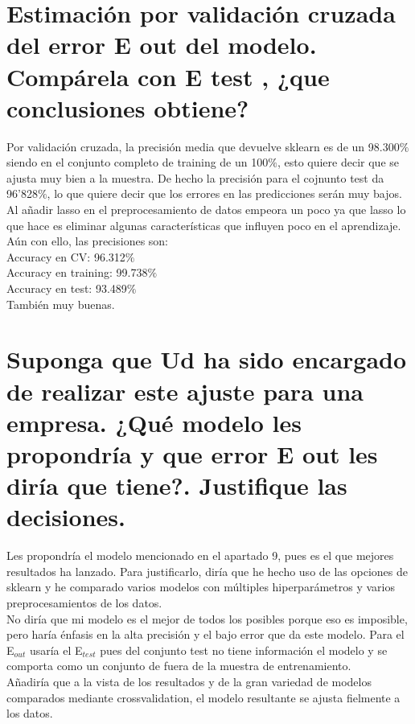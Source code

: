 \documentclass[12pt]{article}
\begin{document}
\section{Estimación por validación cruzada del error E out del modelo. Compárela con E test , ¿que
conclusiones obtiene?}

Por validación cruzada, la precisión media que devuelve sklearn es de un 98.300$\%$ siendo en el conjunto completo de training de un 100$\%$, esto quiere decir que se ajusta muy bien a la muestra. De hecho la precisión para el cojnunto test da 96'828$\%$, lo que quiere decir que los errores en las predicciones serán muy bajos.\\
Al añadir lasso en el preprocesamiento de datos empeora un poco ya que lasso lo que hace es eliminar algunas características que influyen poco en el aprendizaje. Aún con ello, las precisiones son:\\
Accuracy en CV: 96.312$\%$\\
Accuracy en training: 99.738$\%$\\
Accuracy en test: 93.489$\%$\\
También muy buenas.

\section{Suponga que Ud ha sido encargado de realizar este ajuste para una empresa. ¿Qué modelo
les propondría y que error E out les diría que tiene?. Justifique las decisiones.}

Les propondría el modelo mencionado en el apartado 9, pues es el que mejores resultados ha lanzado. Para justificarlo, diría que he hecho uso de las opciones de sklearn y he comparado varios modelos con múltiples hiperparámetros y varios preprocesamientos de los datos.\\
No diría que mi modelo es el mejor de todos los posibles porque eso es imposible, pero haría énfasis en la alta precisión y el bajo error que da este modelo. Para el E$_{out}$ usaría el E$_{test}$ pues del conjunto test no tiene información el modelo y se comporta como un conjunto de fuera de la muestra de entrenamiento.\\
Añadiría que a la vista de los resultados y de la gran variedad de modelos comparados mediante crossvalidation, el modelo resultante se ajusta fielmente a los datos.







 
\end{document}

